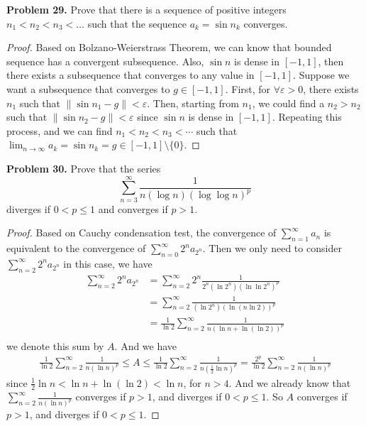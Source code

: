\documentclass[12pt,leqno]{amsart}
\begin{document}
\medskip

\noindent
{\bf Problem 29.}
Prove that there is a sequence of positive integers
$n_1<n_2< n_3 <\ldots$ such that the sequence
$a_k=\sin n_k$ converges.

\begin{proof}
Based on Bolzano-Weierstrass Theorem, we can know that bounded sequence has a convergent subsequence. Also, $\sin n$ is dense in $[-1,1]$, then there exists a subsequence that converges to any value in $[-1,1]$. Suppose we want a subsequence that converges to $g \in [-1,1]$. First, for $\forall \varepsilon > 0$, there exists $n_1$ such that $\| \sin n_1 - g\| < \varepsilon$. Then, starting from $n_1$, we could find a $n_2 > n_2$ such that  $\| \sin n_2 - g\| < \varepsilon$ since $\sin n$ is dense in $[-1,1]$. Repeating this process, and we can find $n_1 < n_2 < n_3 < \cdots$ such that $\lim_{n\to\infty} a_k = \sin n_k = g \in [-1,1]\setminus \{0\}$.
\end{proof}

\medskip



\noindent
{\bf Problem 30.}
Prove that the series
$$
\sum_{n=3}^\infty
\frac{1}{n (\log n) (\log \log n)^p}
$$
diverges if $0<p\leq 1$ and converges if $p>1$.

\begin{proof}
Based on Cauchy condensation test, the convergence of $\sum_{n=1}^\infty a_n$ is equivalent to the convergence of $\sum_{n=0}^\infty 2^n a_{2^n}$. Then we only need to consider $\sum_{n=2}^\infty 2^n a_{2^n}$ in this case, we have
\begin{align*}
    \sum_{n=2}^\infty 2^n a_{2^n} & = \sum_{n=2}^\infty 2^n \frac{1}{2^n (\ln 2^n)(\ln \ln 2^n)^p} \\
    & = \sum_{n=2}^\infty \frac{1}{(\ln 2^n)(\ln (n \ln 2))^p} \\
    & = \frac{1}{\ln 2} \sum_{n=2}^\infty \frac{1}{n(\ln n + \ln (\ln 2))^p} \\
\end{align*}
we denote this sum by $A$. And we have
\begin{align*}
   \frac{1}{\ln 2} \sum_{n=2}^\infty \frac{1}{n(\ln n)^p} \leq  A \leq \frac{1}{\ln 2} \sum_{n=2}^\infty \frac{1}{n(\frac{1}{2}\ln n)^p} = \frac{2^p}{\ln 2} \sum_{n=2}^\infty \frac{1}{n(\ln n)^p}
\end{align*}
since $\frac{1}{2}\ln n < \ln n + \ln (\ln 2) < \ln n$, for $n > 4$. And we already know that $\sum_{n=2}^\infty \frac{1}{n(\ln n)^p}$ converges if $p>1$, and diverges if $0 < p \leq 1$. So $A$ converges if $p>1$, and diverges if $0 < p \leq 1$. 
\end{proof}
\end{document}
